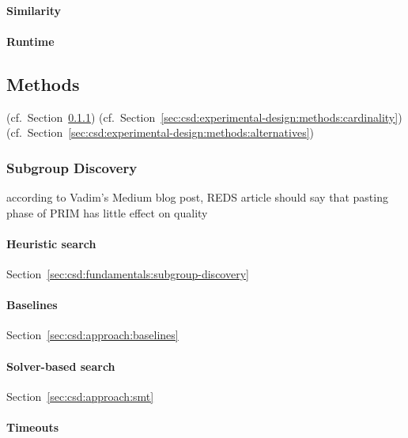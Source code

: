 \documentclass{article}
\theoremstyle{definition}
\begin{document}
\paragraph{Similarity}

\paragraph{Runtime}

\subsection{Methods}
\label{sec:csd:experimental-design:methods}

(cf.~Section~\ref{sec:csd:experimental-design:methods:subgroup-discovery}) (cf.~Section~\ref{sec:csd:experimental-design:methods:cardinality}) (cf.~Section~\ref{sec:csd:experimental-design:methods:alternatives})

\subsubsection{Subgroup Discovery}
\label{sec:csd:experimental-design:methods:subgroup-discovery}

according to Vadim's Medium blog post, REDS article should say that pasting phase of PRIM has little effect on quality

\cite{lemmerich2019pysubgroup}
\cite{arzamasov2021reds}

\paragraph{Heuristic search}

Section~\ref{sec:csd:fundamentals:subgroup-discovery}

\paragraph{Baselines}

Section~\ref{sec:csd:approach:baselines}

\paragraph{Solver-based search}

Section~\ref{sec:csd:approach:smt}

\paragraph{Timeouts}
\end{document}
